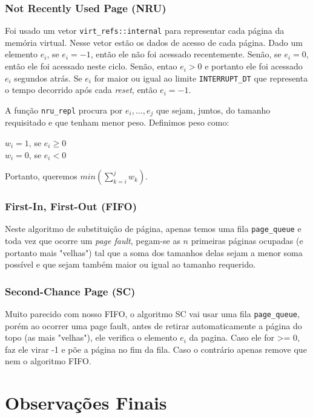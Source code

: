 \documentclass{beamer}
\begin{document}

\begin{frame}
  \frametitle{Not Recently Used Page (NRU)}
  Foi usado um vetor \texttt{virt\_refs::internal} para representar cada página da memória virtual.
  Nesse vetor estão os dados de acesso de cada página. Dado um elemento $e_i$, se $e_i=-1$, então
  ele não foi acessado recentemente. Senão, se $e_i=0$, então ele foi acessado neste ciclo. Senão,
  entao $e_i>0$ e portanto ele foi acessado $e_i$ segundos atrás. Se $e_i$ for maior ou igual ao
  limite \texttt{INTERRUPT\_DT} que representa o tempo decorrido após cada \textit{reset}, então
  $e_i=-1$.

  A função \texttt{nru\_repl} procura por $e_i,...,e_j$ que sejam, juntos, do tamanho requisitado e
  que tenham menor peso. Definimos peso como:

  $w_i = 1$, se $e_i \geq 0$ \\
  $w_i = 0$, se $e_i < 0$

  Portanto, queremos $min(\sum_{k=i}^j w_k)$.
\end{frame}


\begin{frame}
  \frametitle{First-In, First-Out (FIFO)}
  Neste algoritmo de substituição de página, apenas temos uma fila \texttt{page\_queue} e toda vez
  que ocorre um \textit{page fault}, pegam-se as $n$ primeiras páginas ocupadas (e portanto mais
  "velhas") tal que a soma dos tamanhos delas sejam a menor soma possível e que sejam também maior
  ou igual ao tamanho requerido.
\end{frame}


\begin{frame}
\frametitle{Second-Chance Page (SC)}
Muito parecido com nosso FIFO, o algoritmo SC vai usar uma fila \texttt{page\_queue}, porém ao ocorrer uma page fault, antes de retirar automaticamente a página do topo (as mais "velhas"), ele verifica o elemento $e_i$ da pagina. Caso ele for >= 0, faz ele virar -1 e põe a página no fim da fila. Caso o contrário apenas remove que nem o algoritmo FIFO.
\end{frame}


\section{Observações Finais}
\end{document}
